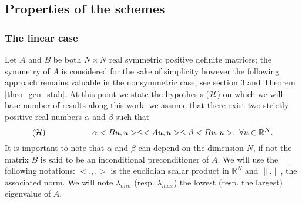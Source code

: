 \documentclass[11pt]{article}
\begin{document}
{\subsection{Properties of the schemes}
\subsubsection{The linear case}
Let $A$ and $B$ be both $N\times N$  real symmetric positive definite matrices; the symmetry of $A$ is considered for the sake of simplicity however  the following approach remains valuable in the nonsymmetric case, see section 3 and 
Theorem \ref{theo_gen_stab}. At this point we state the hypothesis (${\cal H}$) on which we will base number of results along this work: we assume that there exist two strictly positive real numbers $\alpha$ and $\beta$ such that
$$
({\cal H})\hskip 2.cm  \alpha <Bu,u>\le <Au,u> \le \beta <Bu,u>, \ \forall u \in {\mathbb R}^N.
$$
It is important to note that $\alpha$ and $\beta$ can depend on the dimension $N$, if not the matrix $B$ is said to be an inconditional preconditioner of $A$.
We will use the following notations: $<.,.>$ is the euclidian scalar product in ${\mathbb R}^N$ and 
$\parallel .\parallel$, the associated norm.
We will note $\lambda_{min}$ (resp. $\lambda_{max}$) the lowest (resp. the largest) eigenvalue of $A$.\\

}
\end{document}
